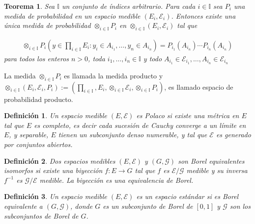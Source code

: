 \documentclass{article}
\newtheorem{Def}{Definición}
\newtheorem{Teo}{Teorema}
\begin{document}
\begin{Teo}
Sea $\mathbb{I}$ un conjunto de \'indices arbitrario. Para cada $i\in\mathbb{I}$ sea $P_{i}$ una medida de probabilidad en un espacio medible $\left(E_{i},\mathcal{E}_{i}\right)$. Entonces existe una \'unica medida de probabilidad $\otimes_{i\in\mathbb{I}}P_{i}$ en $\otimes_{i\in\mathbb{I}}\left(E_{i},\mathcal{E}_{i}\right)$ tal que 

\begin{eqnarray*}
\otimes_{i\in\mathbb{I}}P_{i}\left(y\in\prod_{i\in\mathbb{I}}E_{i}:y_{i}\in A_{i_{1}},\ldots,y_{n}\in A_{i_{n}}\right)=P_{i_{1}}\left(A_{i_{n}}\right)\cdots P_{i_{n}}\left(A_{i_{n}}\right)
\end{eqnarray*}
para todos los enteros $n>0$, toda $i_{1},\ldots,i_{n}\in\mathbb{I}$ y todo $A_{i_{1}}\in\mathcal{E}_{i_{1}},\ldots,A_{i_{n}}\in\mathcal{E}_{i_{n}}$
\end{Teo}

La medida $\otimes_{i\in\mathbb{I}}P_{i}$ es llamada la medida producto y $\otimes_{i\in\mathbb{I}}\left(E_{i},\mathcal{E}_{i},P_{i}\right):=\left(\prod_{i\in\mathbb{I}},E_{i},\otimes_{i\in\mathbb{I}}\mathcal{E}_{i},\otimes_{i\in\mathbb{I}}P_{i}\right)$, es llamado espacio de probabilidad producto.


\begin{Def}
Un espacio medible $\left(E,\mathcal{E}\right)$ es \textit{Polaco} si existe una m\'etrica en $E$ tal que $E$ es completo, es decir cada sucesi\'on de Cauchy converge a un l\'imite en $E$, y \textit{separable}, $E$ tienen un subconjunto denso numerable, y tal que $\mathcal{E}$ es generado por conjuntos abiertos.
\end{Def}


\begin{Def}
Dos espacios medibles $\left(E,\mathcal{E}\right)$ y $\left(G,\mathcal{G}\right)$ son Borel equivalentes \textit{isomorfos} si existe una biyecci\'on $f:E\rightarrow G$ tal que $f$ es $\mathcal{E}/\mathcal{G}$ medible y su inversa $f^{-1}$ es $\mathcal{G}/\mathcal{E}$ medible. La biyecci\'on es una equivalencia de Borel.
\end{Def}

\begin{Def}
Un espacio medible  $\left(E,\mathcal{E}\right)$ es un \textit{espacio est\'andar} si es Borel equivalente a $\left(G,\mathcal{G}\right)$, donde $G$ es un subconjunto de Borel de $\left[0,1\right]$ y $\mathcal{G}$ son los subconjuntos de Borel de $G$.
\end{Def}
\end{document}
